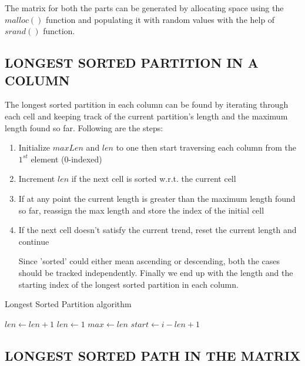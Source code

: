 \documentclass[letterpaper, 11 pt, conference]{ieeeconf}  %
\begin{document}
The matrix for both the parts can be generated by allocating space using the $malloc()$ function and populating it with random values with the help of $srand()$ function.

\subsection{LONGEST SORTED PARTITION IN A COLUMN}

The longest sorted partition in each column can be found by iterating through each cell and keeping track of the current partition's length and the maximum length found so far. Following are the steps: \\ 
\begin{enumerate}
\item Initialize $maxLen$ and $len$ to one then start traversing each column from the $1^{st}$ element (0-indexed)
\item Increment $len$ if the next cell is sorted w.r.t. the current cell
\item If at any point the current length is greater than the maximum length found so far, reassign the max length and store the index of the initial cell
\item If the next cell doesn't satisfy the current trend, reset the current length and continue

Since 'sorted' could either mean ascending or descending, both the cases should be tracked independently. Finally we end up with the length and the starting index of the longest sorted partition in each column.
\end{enumerate}

\begin{algorithm}
\caption{Longest Sorted Partition algorithm}\label{alg:partition}
\begin{algorithmic}
            \State $len\gets len+1$
        \Else
        	\State $len\gets1$
        \EndIf    
            \State $max\gets len$
            \State $start\gets i - len + 1$
        \EndIf
	\EndFor
\EndFor
\end{algorithmic}
\end{algorithm}

\subsection{LONGEST SORTED PATH IN THE MATRIX}
\end{document}
